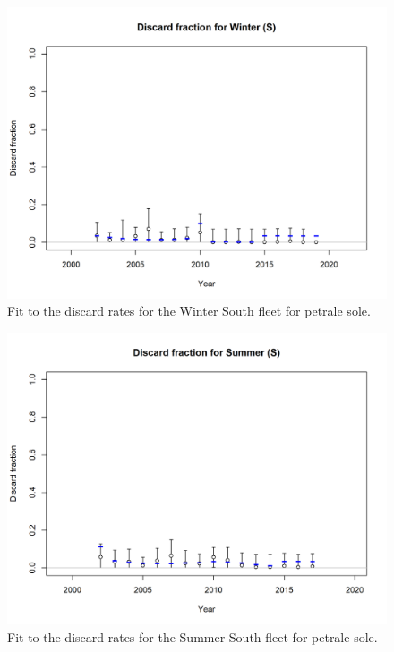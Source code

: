 \documentclass[12pt,]{article}
\begin{document}
\FloatBarrier

\begin{figure}
\centering
\includegraphics{r4ss/plots_mod1/discard_fitWinter (S).png}
\caption{Fit to the discard rates for the Winter South fleet for petrale
sole. \label{fig:fit_ws_discard}}
\end{figure}

\FloatBarrier

\begin{figure}
\centering
\includegraphics{r4ss/plots_mod1/discard_fitSummer (S).png}
\caption{Fit to the discard rates for the Summer South fleet for petrale
sole. \label{fig:fit_ss_discard}}
\end{figure}
\end{document}

